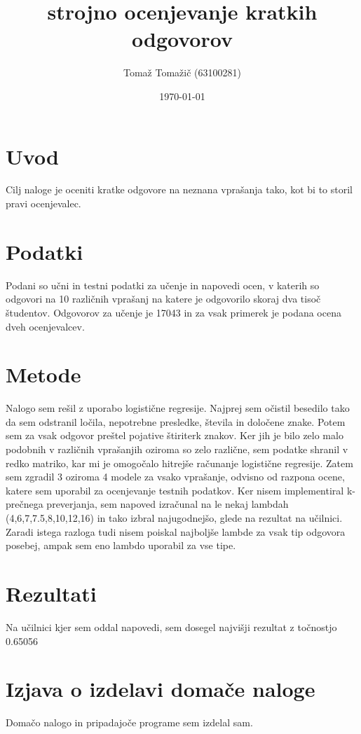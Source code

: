 \documentclass[a4paper,11pt]{article}
\title{strojno ocenjevanje kratkih odgovorov}
\author{Tomaž Tomažič (63100281)}
\date{\today}
\begin{document}
\maketitle

\section{Uvod}

Cilj naloge je oceniti kratke odgovore na neznana vprašanja tako, kot bi to storil pravi ocenjevalec.

\section{Podatki}

Podani so učni in testni  podatki za učenje in napovedi ocen, v katerih so odgovori na 10 različnih vprašanj na katere je odgovorilo skoraj dva tisoč študentov.
Odgovorov za učenje je 17043 in za vsak primerek je podana ocena dveh ocenjevalcev.

\section{Metode}

Nalogo sem rešil z uporabo logistične regresije. Najprej sem očistil besedilo tako da sem odstranil ločila, nepotrebne presledke, števila in določene znake. Potem sem za vsak odgovor preštel pojative štiriterk znakov. Ker jih je bilo zelo malo podobnih v različnih vprašanjih oziroma so zelo različne, sem podatke shranil v redko matriko, kar mi je omogočalo hitrejše računanje logistične regresije. Zatem sem zgradil 3 oziroma 4 modele za vsako vprašanje, odvisno od razpona ocene, katere sem uporabil za ocenjevanje testnih podatkov. Ker nisem implementiral k-prečnega preverjanja, sem napoved izračunal na le nekaj lambdah (4,6,7,7.5,8,10,12,16) in tako izbral najugodnejšo, glede na rezultat na učilnici. Zaradi istega razloga tudi nisem poiskal najboljše lambde za vsak tip odgovora posebej, ampak sem eno lambdo uporabil za vse tipe.

\section{Rezultati}

Na učilnici kjer sem oddal napovedi, sem dosegel najvišji rezultat z točnostjo 0.65056%

\section{Izjava o izdelavi domače naloge}
Domačo nalogo in pripadajoče programe sem izdelal sam.
\end{document}
